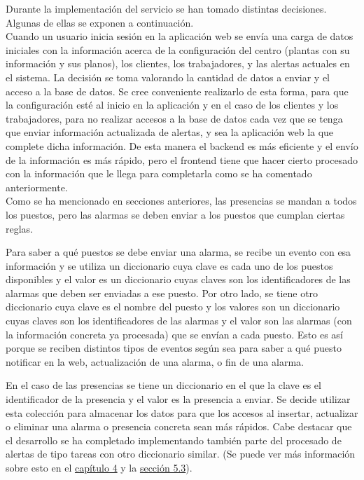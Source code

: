 Durante la implementación del servicio se han tomado distintas decisiones. Algunas de ellas se exponen a continuación.\\

Cuando un usuario inicia sesión en la aplicación web se envía una carga de datos iniciales con la información acerca de la configuración del centro (plantas con su información y sus planos), los clientes, los trabajadores, y las alertas actuales en el sistema. La decisión se toma valorando la cantidad de datos a enviar y el acceso a la base de datos. Se cree conveniente realizarlo de esta forma, para que la configuración esté al inicio en la aplicación y en el caso de los clientes y los trabajadores, para no realizar accesos a la base de datos cada vez que se tenga que enviar información actualizada de alertas, y sea la aplicación web la que complete dicha información. De esta manera el backend es más eficiente y el envío de la información es más rápido, pero el frontend tiene que hacer cierto procesado con la información que le llega para completarla como se ha comentado anteriormente.\\

Como se ha mencionado en secciones anteriores, las presencias se mandan a todos los puestos, pero las alarmas se deben enviar a los puestos que cumplan ciertas reglas.

Para saber a qué puestos se debe enviar una alarma, se recibe un evento con esa información y se utiliza un diccionario cuya clave es cada uno de los puestos disponibles y el valor es un diccionario cuyas claves son los identificadores de las alarmas que deben ser enviadas a ese puesto. Por otro lado, se tiene otro diccionario cuya clave es el nombre del puesto y los valores son un diccionario cuyas claves son los identificadores de las alarmas y el valor son las alarmas (con la información concreta ya procesada) que se envían a cada puesto. Esto es así porque se reciben distintos tipos de eventos según sea para saber a qué puesto notificar en la web, actualización de una alarma, o fin de una alarma.

En el caso de las presencias se tiene un diccionario en el que la clave es el identificador de la presencia y el valor es la presencia a enviar.
Se decide utilizar esta colección para almacenar los datos para que los accesos al insertar, actualizar o eliminar una alarma o presencia concreta sean más rápidos.
Cabe destacar que el desarrollo se ha completado implementando también parte del procesado de alertas de tipo tareas con otro diccionario similar. (Se puede ver más información sobre esto en el \hyperref[section-gestion-proyecto]{capítulo 4} y la \hyperref[section-trabajo-futuro]{sección 5.3}).\\

